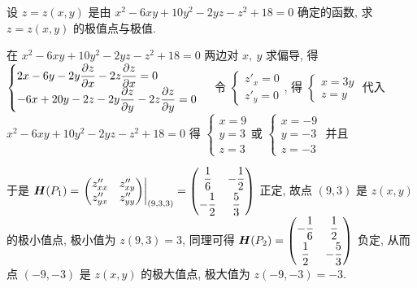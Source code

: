 \begin{example}[2004 数一]
    设 $z=z(x,y)$ 是由 $x^2-6xy+10y^2-2yz-z^2+18=0$ 确定的函数, 求 $z=z(x,y)$ 的极值点与极值.
\end{example}
\begin{solution}
    在 $x^2-6xy+10y^2-2yz-z^2+18=0$ 两边对 $x,~y$ 求偏导, 得 $\begin{cases}
        \displaystyle 2x-6y-2y\pdv{z}{x}-2z\pdv{z}{x}=0\\ 
        \displaystyle -6x+20y-2z-2y\pdv{z}{y}-2z\pdv{z}{y}=0
    \end{cases}$ 令 $\begin{cases}
        z'_x=0\\ z'_y=0
    \end{cases}$, 得 $\begin{cases}
        x=3y\\ z=y 
    \end{cases}$ 代入 $x^2-6xy+10y^2-2yz-z^2+18=0$ 得 $\begin{cases}
        x=9\\ y=3 \\ z=3
    \end{cases}\text{或 } \begin{cases}
        x=-9\\ y=-3 \\ z=-3
    \end{cases}$ 并且 
    于是 $\vb*{H}(P_1)=\eval{\mqty(z''_{xx}&z''_{xy}\\z''_{yx}&z''_{yy})}_{(9,3,3)}=\mqty(\dfrac{1}{6}&-\dfrac{1}{2}\\[6pt]-\dfrac{1}{2}&\dfrac{5}{3})$ 正定, 故点 $(9,3)$ 是 $z(x,y)$ 的极小值点, 极小值为 $z(9,3)=3$, 
    同理可得 $\vb*{H}(P_2)=\mqty(-\dfrac{1}{6}&\dfrac{1}{2}\\[6pt]\dfrac{1}{2}&-\dfrac{5}{3})$ 负定, 从而点 $(-9,-3)$ 是 $z(x,y)$ 的极大值点, 极大值为 $z(-9,-3)=-3.$
\end{solution}

